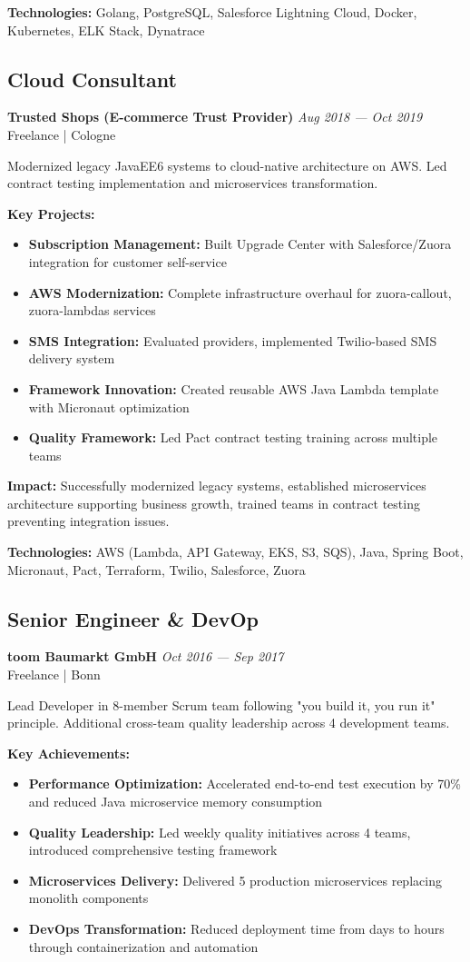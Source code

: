 \documentclass[10pt,a4paper]{article}
\newcommand{\role}[4]{\subsection{#1}\textbf{#2} \hfill \textit{#3}\\#4\vspace{2mm}}
\newcommand{\achievement}[1]{\item \textbf{#1}}
\begin{document}
\textbf{Technologies:} Golang, PostgreSQL, Salesforce Lightning Cloud, Docker, Kubernetes, ELK Stack, Dynatrace

\role{Cloud Consultant}{Trusted Shops (E-commerce Trust Provider)}{Aug 2018 — Oct 2019}{Freelance | Cologne}

Modernized legacy JavaEE6 systems to cloud-native architecture on AWS. Led contract testing implementation and microservices transformation.

\textbf{Key Projects:}
\begin{itemize}
\item \textbf{Subscription Management:} Built Upgrade Center with Salesforce/Zuora integration for customer self-service
\item \textbf{AWS Modernization:} Complete infrastructure overhaul for zuora-callout, zuora-lambdas services
\item \textbf{SMS Integration:} Evaluated providers, implemented Twilio-based SMS delivery system
\item \textbf{Framework Innovation:} Created reusable AWS Java Lambda template with Micronaut optimization
\item \textbf{Quality Framework:} Led Pact contract testing training across multiple teams
\end{itemize}

\textbf{Impact:} Successfully modernized legacy systems, established microservices architecture supporting business growth, trained teams in contract testing preventing integration issues.

\textbf{Technologies:} AWS (Lambda, API Gateway, EKS, S3, SQS), Java, Spring Boot, Micronaut, Pact, Terraform, Twilio, Salesforce, Zuora

\role{Senior Engineer \& DevOp}{toom Baumarkt GmbH}{Oct 2016 — Sep 2017}{Freelance | Bonn}

Lead Developer in 8-member Scrum team following "you build it, you run it" principle. Additional cross-team quality leadership across 4 development teams.

\textbf{Key Achievements:}
\begin{itemize}
\achievement{Performance Optimization:} Accelerated end-to-end test execution by 70\% and reduced Java microservice memory consumption
\achievement{Quality Leadership:} Led weekly quality initiatives across 4 teams, introduced comprehensive testing framework
\achievement{Microservices Delivery:} Delivered 5 production microservices replacing monolith components
\achievement{DevOps Transformation:} Reduced deployment time from days to hours through containerization and automation
\end{itemize}
\end{document}
